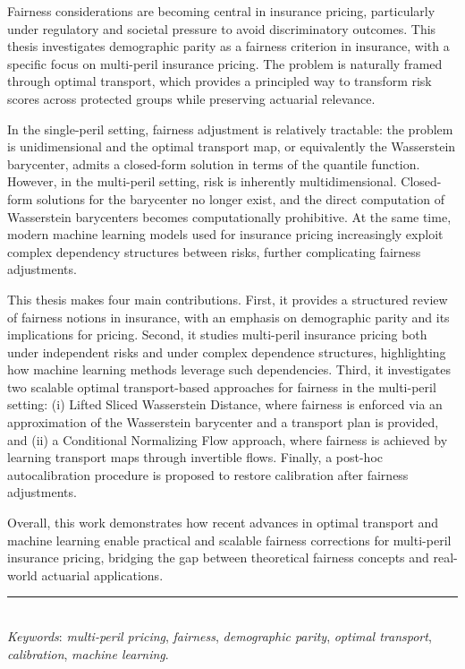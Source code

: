 \documentclass[
  a4paper,
  11pt,
  a4paper,
  twoside,
  openright]{report}
\begin{document}
Fairness considerations are becoming central in insurance pricing,
particularly under regulatory and societal pressure to avoid
discriminatory outcomes. This thesis investigates demographic parity as
a fairness criterion in insurance, with a specific focus on multi-peril
insurance pricing. The problem is naturally framed through optimal
transport, which provides a principled way to transform risk scores
across protected groups while preserving actuarial relevance.

In the single-peril setting, fairness adjustment is relatively
tractable: the problem is unidimensional and the optimal transport map,
or equivalently the Wasserstein barycenter, admits a closed-form
solution in terms of the quantile function. However, in the multi-peril
setting, risk is inherently multidimensional. Closed-form solutions for
the barycenter no longer exist, and the direct computation of
Wasserstein barycenters becomes computationally prohibitive. At the same
time, modern machine learning models used for insurance pricing
increasingly exploit complex dependency structures between risks,
further complicating fairness adjustments.

This thesis makes four main contributions. First, it provides a
structured review of fairness notions in insurance, with an emphasis on
demographic parity and its implications for pricing. Second, it studies
multi-peril insurance pricing both under independent risks and under
complex dependence structures, highlighting how machine learning methods
leverage such dependencies. Third, it investigates two scalable optimal
transport-based approaches for fairness in the multi-peril setting: (i)
Lifted Sliced Wasserstein Distance, where fairness is enforced via an
approximation of the Wasserstein barycenter and a transport plan is
provided, and (ii) a Conditional Normalizing Flow approach, where
fairness is achieved by learning transport maps through invertible
flows. Finally, a post-hoc autocalibration procedure is proposed to
restore calibration after fairness adjustments.

Overall, this work demonstrates how recent advances in optimal transport
and machine learning enable practical and scalable fairness corrections
for multi-peril insurance pricing, bridging the gap between theoretical
fairness concepts and real-world actuarial applications.

\noindent\rule{\textwidth}{0.4pt}\\[0.6em]

\emph{Keywords}: \emph{multi-peril pricing}, \emph{fairness},
\emph{demographic parity}, \emph{optimal transport}, \emph{calibration},
\emph{machine learning}.
\end{document}
